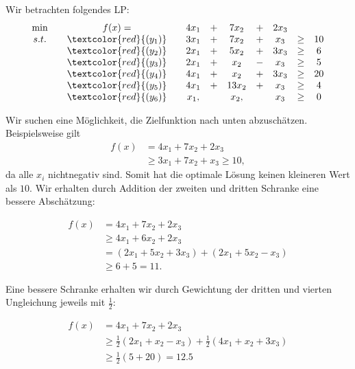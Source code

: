\documentclass[language=ngerman,algolist]{TemplateLecture}
\begin{document}
Wir betrachten folgendes LP: 
\begin{equation}
    \begin{matrix}
        \min & f(x) = & 4x_1 & + & 7x_2 & + & 2x_3 \\
        s.t. &  \quad \textcolor{red}{(y_1)} \quad & 3x_1 & + & 7x_2 & + & x_3 & \geq & 10 \\
        & \quad \textcolor{red}{(y_2)} \quad & 2x_1 & + & 5x_2 & + & 3x_3 & \geq & 6 \\
        & \quad \textcolor{red}{(y_3)} \quad & 2x_1 & + &  x_2 & - &  x_3 & \geq & 5 \\
        & \quad \textcolor{red}{(y_4)} \quad & 4x_1 & + &  x_2 & + & 3x_3 & \geq & 20 \\
        & \quad \textcolor{red}{(y_5)} \quad & 4x_1 & + & 13x_2& + &  x_3 & \geq & 4\\
        & \quad \textcolor{red}{(y_6)} \quad & x_1, &  & x_2, & & x_3 & \geq & 0
    \end{matrix}\label{eq:primalExpl}
\end{equation}

Wir suchen eine Möglichkeit, die Zielfunktion nach unten abzuschätzen. Beispielsweise gilt 
\begin{equation*}
    \begin{split}
        f(x) &= 4x_1 + 7x_2 + 2x_3 \\
        &\geq 3x_1 + 7x_2 + x_3 \geq 10,
    \end{split}
\end{equation*}
da alle $x_i$ nichtnegativ sind. Somit hat die optimale Lösung keinen kleineren Wert als $10$. Wir erhalten durch Addition der zweiten und dritten Schranke eine bessere Abschätzung:

\begin{equation*}
    \begin{split}
        f(x) &= 4x_1 + 7x_2 + 2x_3 \\
        &\geq 4x_1 + 6x_2 + 2x_3 \\
        &= (2x_1 + 5x_2 + 3x_3) + (2x_1 + 5x_2 - x_3) \\
        &\geq 6 + 5 = 11.
    \end{split}
\end{equation*}

Eine bessere Schranke erhalten wir durch Gewichtung der dritten und vierten Ungleichung jeweils mit $\frac{1}{2}$:

\begin{equation*}
    \begin{split}
        f(x) &= 4x_1 + 7x_2 + 2x_3 \\
        &\geq \frac{1}{2}(2x_1 + x_2 - x_3) + \frac{1}{2}(4x_1 + x_2 + 3x_3) \\
        &\geq \frac{1}{2}(5 + 20) = 12.5
    \end{split}
\end{equation*}
\end{document}
